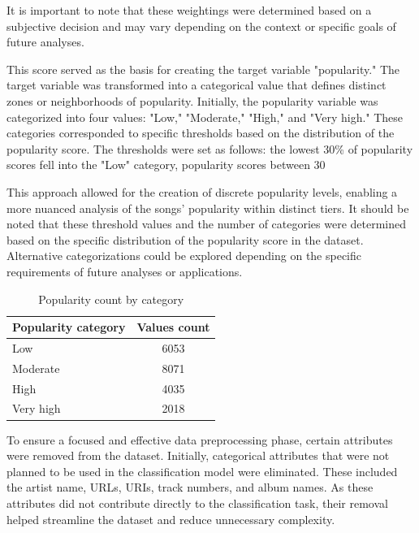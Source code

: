 \documentclass[11pt]{article} %
\begin{document}
It is important to note that these weightings were determined based on a subjective decision and may vary depending on the context or specific goals of future analyses.

This score served as the basis for creating the target variable "popularity." The target variable was transformed into a categorical value that defines distinct zones or neighborhoods of popularity. Initially, the popularity variable was categorized into four values: "Low," "Moderate," "High," and "Very high." These categories corresponded to specific thresholds based on the distribution of the popularity score. The thresholds were set as follows: the lowest 30\% of popularity scores fell into the "Low" category, popularity scores between 30%

This approach allowed for the creation of discrete popularity levels, enabling a more nuanced analysis of the songs' popularity within distinct tiers. It should be noted that these threshold values and the number of categories were determined based on the specific distribution of the popularity score in the dataset. Alternative categorizations could be explored depending on the specific requirements of future analyses or applications.

\begin{table}[H]
	\centering
	\begin{tabular}{lc}
		\toprule
		\textbf{Popularity category} & \textbf{Values count} \\
		\midrule
		Low                          & 6053                  \\
		Moderate                     & 8071                  \\
		High                         & 4035                  \\
		Very high                    & 2018                  \\
		\bottomrule
	\end{tabular}
	\caption{Popularity count by category}
	\label{tab:stats}
\end{table}

To ensure a focused and effective data preprocessing phase, certain attributes were removed from the dataset. Initially, categorical attributes that were not planned to be used in the classification model were eliminated. These included the artist name, URLs, URIs, track numbers, and album names. As these attributes did not contribute directly to the classification task, their removal helped streamline the dataset and reduce unnecessary complexity.
\end{document}
